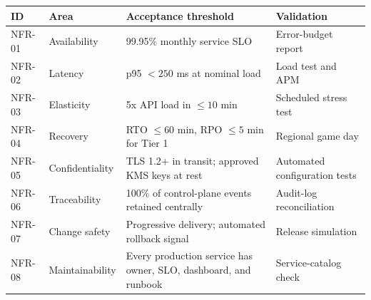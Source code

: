 \begin{tabularx}{\textwidth}{@{}C{14mm}L{30mm}Y L{36mm}@{}}
  \toprule
  \color{white}\textbf{ID} & \color{white}\textbf{Area} & \color{white}\textbf{Acceptance threshold} & \color{white}\textbf{Validation} \\
  \midrule
  NFR-01 & Availability & 99.95\% monthly service SLO & Error-budget report \\
  NFR-02 & Latency & p95 $<250$ ms at nominal load & Load test and APM \\
  NFR-03 & Elasticity & 5x API load in $\leq10$ min & Scheduled stress test \\
  NFR-04 & Recovery & RTO $\leq60$ min, RPO $\leq5$ min for Tier 1 & Regional game day \\
  NFR-05 & Confidentiality & TLS 1.2+ in transit; approved KMS keys at rest & Automated configuration tests \\
  NFR-06 & Traceability & 100\% of control-plane events retained centrally & Audit-log reconciliation \\
  NFR-07 & Change safety & Progressive delivery; automated rollback signal & Release simulation \\
  NFR-08 & Maintainability & Every production service has owner, SLO, dashboard, and runbook & Service-catalog check \\
  \bottomrule
\end{tabularx}

